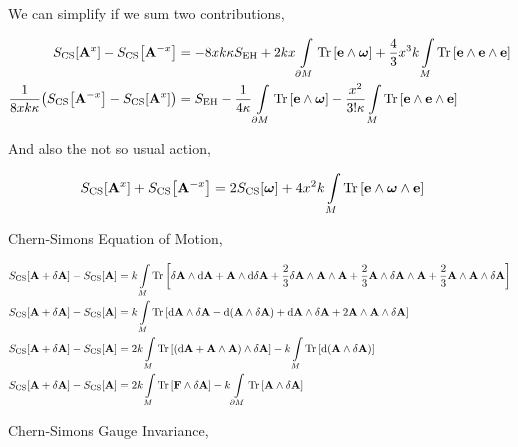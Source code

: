 We can simplify if we sum two contributions,

\begin{align*}
    S_{\textnormal{CS}}\qty[\vb A^x]-S_{\textnormal{CS}}\qty[\vb A^{-x}]&=-8xk\kappa S_{\textnormal{EH}}+2kx\int\limits_{\partial M}\Tr\qty[\vb e\wedge\boldsymbol\omega]+\frac43x^3k\int\limits_M\Tr\qty[\vb e\wedge\vb e\wedge\vb e]\\
    \frac{1}{8xk\kappa}\qty(S_{\textnormal{CS}}\qty[\vb A^{-x}]-S_{\textnormal{CS}}\qty[\vb A^x])&=S_{\textnormal{EH}}-\frac{1}{4\kappa}\int\limits_{\partial M}\Tr\qty[\vb e\wedge\boldsymbol\omega]-\frac{x^2}{3!\kappa}\int\limits_M\Tr\qty[\vb e\wedge\vb e\wedge\vb e]
\end{align*}

And also the not so usual action,

\begin{align*}
    S_{\textnormal{CS}}\qty[\vb A^x]+S_{\textnormal{CS}}\qty[\vb A^{-x}]&=2S_{\textnormal{CS}}\qty[\boldsymbol\omega]+4x^2k\int\limits_M\Tr\qty[\vb e\wedge\boldsymbol\omega\wedge\vb e]
\end{align*}

Chern-Simons Equation of Motion,

\begin{align*}
    S_{\textnormal{CS}}\qty[\vb A+\delta\vb A]-S_{\textnormal{CS}}\qty[\vb A]&=k\int\limits_M\Tr\qty[\delta\vb A\wedge\dd{\vb A}+\vb A\wedge\dd{\delta\vb A}+\frac23\delta\vb A\wedge\vb A\wedge\vb A+\frac23\vb A\wedge\delta\vb A\wedge\vb A+\frac23\vb A\wedge\vb A\wedge\delta\vb A]\\
    S_{\textnormal{CS}}\qty[\vb A+\delta\vb A]-S_{\textnormal{CS}}\qty[\vb A]&=k\int\limits_M\Tr\qty[\dd{\vb A}\wedge\delta\vb A-\dd{\qty(\vb A\wedge\delta\vb A)}+\dd{\vb A}\wedge\delta \vb A+2\vb A\wedge\vb A\wedge\delta\vb A]\\
    S_{\textnormal{CS}}\qty[\vb A+\delta\vb A]-S_{\textnormal{CS}}\qty[\vb A]&=2k\int\limits_M\Tr\qty[\qty(\dd{\vb A}+\vb A\wedge\vb A)\wedge\delta\vb A]-k\int\limits_M\Tr\qty[\dd{\qty(\vb A\wedge\delta\vb A)}]\\
    S_{\textnormal{CS}}\qty[\vb A+\delta\vb A]-S_{\textnormal{CS}}\qty[\vb A]&=2k\int\limits_M\Tr\qty[\vb F\wedge\delta\vb A]-k\int\limits_{\partial M}\Tr\qty[\vb A\wedge\delta\vb A]
\end{align*}

Chern-Simons Gauge Invariance,

